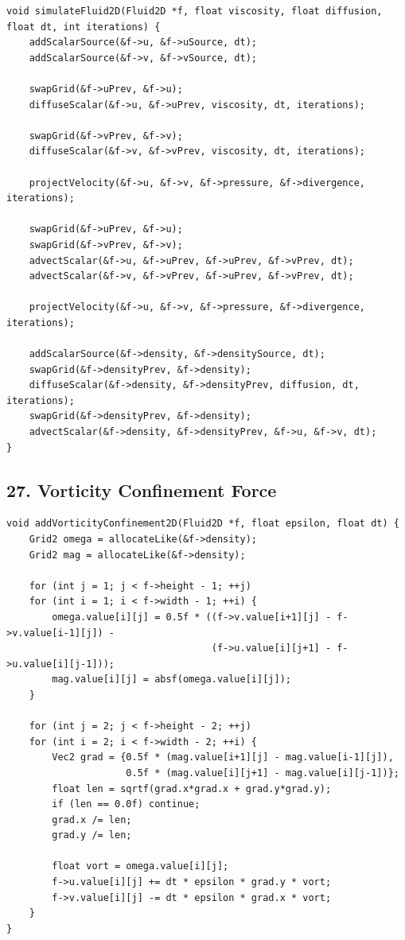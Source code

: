 \documentclass[10pt,letterpaper]{article}
\begin{document}
\begin{verbatim}
void simulateFluid2D(Fluid2D *f, float viscosity, float diffusion, float dt, int iterations) {
    addScalarSource(&f->u, &f->uSource, dt);
    addScalarSource(&f->v, &f->vSource, dt);

    swapGrid(&f->uPrev, &f->u);
    diffuseScalar(&f->u, &f->uPrev, viscosity, dt, iterations);

    swapGrid(&f->vPrev, &f->v);
    diffuseScalar(&f->v, &f->vPrev, viscosity, dt, iterations);

    projectVelocity(&f->u, &f->v, &f->pressure, &f->divergence, iterations);

    swapGrid(&f->uPrev, &f->u);
    swapGrid(&f->vPrev, &f->v);
    advectScalar(&f->u, &f->uPrev, &f->uPrev, &f->vPrev, dt);
    advectScalar(&f->v, &f->vPrev, &f->uPrev, &f->vPrev, dt);

    projectVelocity(&f->u, &f->v, &f->pressure, &f->divergence, iterations);

    addScalarSource(&f->density, &f->densitySource, dt);
    swapGrid(&f->densityPrev, &f->density);
    diffuseScalar(&f->density, &f->densityPrev, diffusion, dt, iterations);
    swapGrid(&f->densityPrev, &f->density);
    advectScalar(&f->density, &f->densityPrev, &f->u, &f->v, dt);
}
\end{verbatim}

\subsection*{27. Vorticity Confinement Force}

\begin{verbatim}
void addVorticityConfinement2D(Fluid2D *f, float epsilon, float dt) {
    Grid2 omega = allocateLike(&f->density);
    Grid2 mag = allocateLike(&f->density);

    for (int j = 1; j < f->height - 1; ++j)
    for (int i = 1; i < f->width - 1; ++i) {
        omega.value[i][j] = 0.5f * ((f->v.value[i+1][j] - f->v.value[i-1][j]) -
                                    (f->u.value[i][j+1] - f->u.value[i][j-1]));
        mag.value[i][j] = absf(omega.value[i][j]);
    }

    for (int j = 2; j < f->height - 2; ++j)
    for (int i = 2; i < f->width - 2; ++i) {
        Vec2 grad = {0.5f * (mag.value[i+1][j] - mag.value[i-1][j]),
                     0.5f * (mag.value[i][j+1] - mag.value[i][j-1])};
        float len = sqrtf(grad.x*grad.x + grad.y*grad.y);
        if (len == 0.0f) continue;
        grad.x /= len;
        grad.y /= len;

        float vort = omega.value[i][j];
        f->u.value[i][j] += dt * epsilon * grad.y * vort;
        f->v.value[i][j] -= dt * epsilon * grad.x * vort;
    }
}
\end{verbatim}
\end{document}
